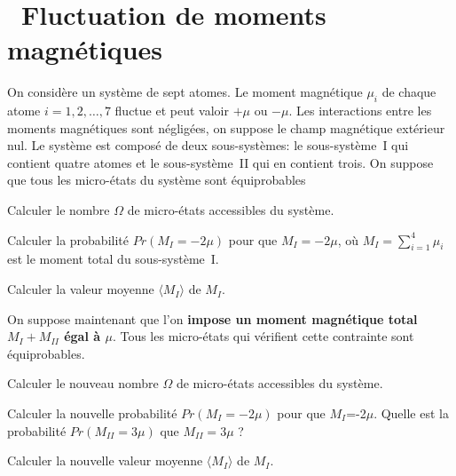 \documentclass[utf8, 11pt]{feuille}
\begin{document}




\section{\soft~Fluctuation de moments magnétiques}

On considère un système de sept atomes. Le moment magnétique $\mu_i$ de chaque atome $i=1,2,\dots, 7$ fluctue et peut valoir $+\mu$ ou $-\mu$. Les interactions entre les moments magnétiques sont négligées, on suppose le champ magnétique extérieur nul. Le système est composé de deux sous-systèmes: le sous-système~I qui contient quatre atomes et le sous-système~II qui en contient trois. On suppose que tous les micro-états du système sont équiprobables

\question
Calculer le nombre $\varOmega$ de micro-états accessibles du système.
  
\question
Calculer la probabilité $Pr(M_I=-2\mu)$ pour que $M_I=-2\mu$, où $\displaystyle M_I=\sum_{i=1}^4 \mu_i$ est le moment total du sous-système~I. 

\question
Calculer la valeur moyenne $\langle M_I \rangle$ de $M_I$. 

\medskip

On suppose maintenant que l'on \textbf{impose un moment magnétique total
$M_I+M_{II}$ égal à $\mu$}. Tous les micro-états qui vérifient cette
contrainte sont équiprobables.

\question
Calculer le nouveau nombre $\varOmega$ de micro-états accessibles du système. 

\question
Calculer la nouvelle probabilité $Pr(M_I=-2\mu)$  pour que $M_I$=-2$\mu$. Quelle est la probabilité $Pr(M_{II}=3\mu)$ que $M_{II}=3\mu$ ? 

\question
Calculer la nouvelle valeur moyenne $\langle M_I \rangle$ de $M_I$. 
\end{document}
